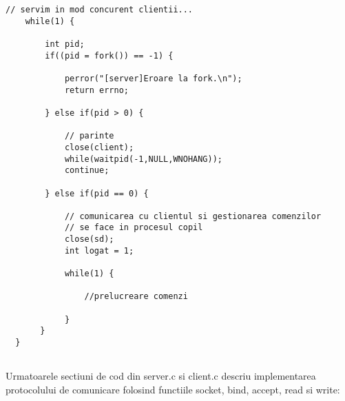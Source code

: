 \documentclass[runningheads]{llncs}
\begin{document}
\begin{verbatim}
// servim in mod concurent clientii...
    while(1) {

        int pid;
        if((pid = fork()) == -1) {

            perror("[server]Eroare la fork.\n");
            return errno;

        } else if(pid > 0) {

            // parinte
            close(client);
            while(waitpid(-1,NULL,WNOHANG));
            continue;

        } else if(pid == 0) {

            // comunicarea cu clientul si gestionarea comenzilor 
            // se face in procesul copil  
            close(sd);
            int logat = 1;

            while(1) {
            
            	//prelucreare comenzi	

            }
       }
  }	
  
\end{verbatim}

Urmatoarele sectiuni de cod din server.c si client.c descriu implementarea protocolului de comunicare folosind functiile socket, bind, accept, read si write: 
\end{document}

